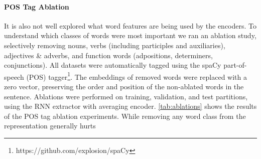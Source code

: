 


\paragraph{POS Tag Ablation}
It is also not well explored what word features are being used by the encoders.
To understand which classes of words were most important we ran an ablation
study, selectively removing nouns, verbs 
(including participles and auxiliaries), adjectives \& adverbs, and 
function words (adpositions, determiners, conjunctions).
All datasets were automatically tagged using
the spaCy part-of-speech (POS)
tagger\footnote{https://github.com/explosion/spaCy}.   
The embeddings of removed words were replaced with a zero vector,
preserving the order and position of the non-ablated words in the sentence.
Ablations were performed on training, validation, and test partitions,
using the RNN extractor with averaging encoder.
\autoref{tab:ablations} shows the results of the POS
tag ablation experiments. 
While removing any word class from the representation generally hurts 
